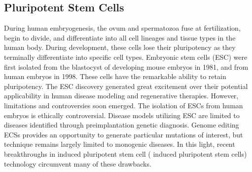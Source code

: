 \documentclass[sigconf]{acmart}
\begin{document}
\subsection{Pluripotent Stem Cells}
During human embryogenesis, the ovum and spermatozoa fuse at fertilization, begin to
divide, and differentiate into all cell lineages and tissue types in the human body. During
development, these cells lose their pluripotency as they terminally differentiate into specific cell
types. Embryonic stem cells (ESC) were first isolated from the blastocyst of developing mouse
embryos in 1981, and from human embryos in 1998. These cells have the remarkable ability to retain pluripotency. The ESC discovery generated great excitement over their potential
applicability in human disease modeling and regenerative therapies. However, limitations and
controversies soon emerged.
The isolation of ESCs from human embryos is ethically controversial. Disease models
utilizing ESC are limited to diseases identified through preimplantation genetic diagnosis.
Genome editing ECSs provides an opportunity to generate particular mutations of interest, but
technique remains largely limited to monogenic diseases. In this light, recent breakthroughs in
induced pluripotent stem cell ( induced pluripotent stem cells) technology circumvent many of these drawbacks.
\end{document}
